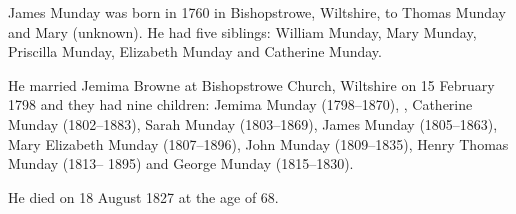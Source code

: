 
James Munday was born in 1760  in Bishopstrowe, Wiltshire, to Thomas Munday and Mary (unknown). He had five siblings:
William Munday,  Mary Munday, Priscilla Munday, Elizabeth Munday and Catherine Munday.

He married Jemima Browne at Bishopstrowe Church, Wiltshire on 15 February 1798 and they had nine children: Jemima Munday (1798--1870), ,
Catherine Munday (1802--1883), Sarah Munday (1803--1869),
James Munday (1805--1863), Mary Elizabeth Munday (1807--1896), John Munday (1809--1835), Henry Thomas Munday (1813-- 1895) and George Munday (1815--1830).

He died on 18 August 1827 at the age of 68.

